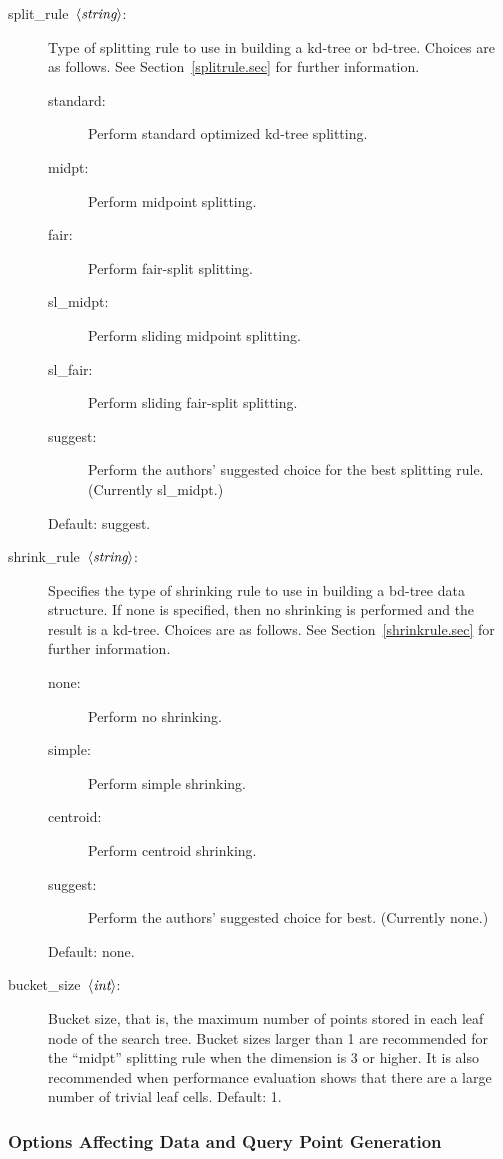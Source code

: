 \documentclass[11pt]{article}		%
\newcommand\ang[1]{\langle #1\rangle}
\newcommand{\STRING}[0]{$\ang{\textit{string}\/}$}
\newcommand{\INT}[0]{$\ang{\textit{int}\/}$}
\begin{document}
\begin{description}
\item[\hbox{\sf split\_rule \STRING:}]
	Type of splitting rule to use in building a kd-tree or bd-tree.
	Choices are as follows. See Section~\ref{splitrule.sec} for
	further information.
	\begin{description}
	\item[\hbox{\sf standard:}] Perform standard optimized kd-tree
			splitting.
	\item[\hbox{\sf midpt:}] Perform midpoint splitting.
	\item[\hbox{\sf fair:}] Perform fair-split splitting.
	\item[\hbox{\sf sl\_midpt:}] Perform sliding midpoint splitting.
	\item[\hbox{\sf sl\_fair:}] Perform sliding fair-split splitting.
	\item[\hbox{\sf suggest:}]	Perform the authors' suggested choice for the
		best splitting rule.  (Currently \textsf{sl\_midpt}.)
	\end{description}
	Default: \textsf{suggest}.
\item[\hbox{\sf shrink\_rule \STRING:}]
	Specifies the type of shrinking rule to use in building a bd-tree
	data structure.  If \textsf{none} is specified, then no shrinking is
	performed and the result is a kd-tree.  Choices are as follows.
	See Section~\ref{shrinkrule.sec} for further information.
	\begin{description}
	\item[\hbox{\sf none:}] Perform no shrinking.
	\item[\hbox{\sf simple:}] Perform simple shrinking.
	\item[\hbox{\sf centroid:}] Perform centroid shrinking.
	\item[\hbox{\sf suggest:}] Perform the authors' suggested choice for best.
		(Currently \textsf{none}.)
	\end{description}
	Default: \textsf{none}.
\item[\hbox{\sf bucket\_size \INT:}]
	Bucket size, that is, the maximum number of points stored in each
	leaf node of the search tree.  Bucket sizes larger than 1 are
	recommended for the ``midpt'' splitting rule when the dimension is 3
	or higher. It is also recommended when performance evaluation shows
	that there are a large number of trivial leaf cells. Default: 1.
\end{description}

\subsubsection{Options Affecting Data and Query Point Generation}
\end{document}
